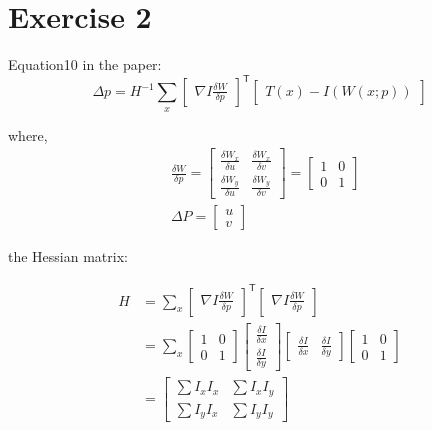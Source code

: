 \documentclass{article}
\begin{document}
\section*{Exercise 2}


Equation10 in the paper:
\begin{equation}
\Delta p= H^{-1}\sum_x \begin{bmatrix}\nabla I \frac{\delta W}{\delta p}\end{bmatrix}^{\mathsf{T}}\begin{bmatrix}T(x)-I(W(x;p))\end{bmatrix}
\end{equation}

where,
\begin{equation}
\begin{aligned}
&\frac{\delta W}{\delta p} = \begin{bmatrix}\frac{\delta W_x}{\delta u}&\frac{\delta W_x}{\delta v}\\ \frac{\delta W_y}{\delta u} & \frac{\delta W_y}{\delta v}  \end{bmatrix}=\begin{bmatrix}1&0\\0&1\end{bmatrix}\\
&\Delta P=\begin{bmatrix}u\\v \end{bmatrix}
\end{aligned}
\end{equation}

the Hessian matrix:

\begin{equation}
\begin{aligned}
H&=\sum_x \begin{bmatrix}\nabla I \frac{\delta W}{\delta p}\end{bmatrix}^{\mathsf{T}}\begin{bmatrix}\nabla I \frac{\delta W}{\delta p}\end{bmatrix}\\
&=\sum_x \begin{bmatrix}1&0\\0&1\end{bmatrix} \begin{bmatrix} \frac{\delta I}{\delta x}\\ \frac{\delta I}{\delta y} \end{bmatrix} \begin{bmatrix} \frac{\delta I}{\delta x}& \frac{\delta I}{\delta y} \end{bmatrix} \begin{bmatrix}1&0\\0&1\end{bmatrix}\\
&= \begin{bmatrix} \sum I_x I_x & \sum I_x I_y\\  \sum I_y I_x & \sum I_y I_y\end{bmatrix}
\end{aligned}
\end{equation}
\end{document}
